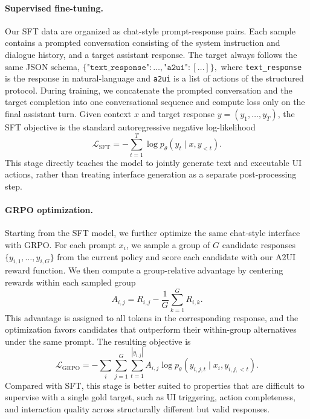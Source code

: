 \documentclass{llmxive}
\begin{document}
\paragraph{Supervised fine-tuning.}
Our SFT data are organized as chat-style prompt-response pairs. Each sample contains a prompted conversation consisting of the system instruction and dialogue history, and a target assistant response. The target always follows the same JSON schema,
\(
\{\texttt{"text\_response"}: \ldots, \texttt{"a2ui"}: [\ldots]\},
\)
where \texttt{text\_response} is the response in natural-language and \texttt{a2ui} is a list of actions of the structured protocol. During training, we concatenate the prompted conversation and the target completion into one conversational sequence and compute loss only on the final assistant turn. Given context $x$ and target response $y=(y_1,\dots,y_T)$, the SFT objective is the standard autoregressive negative log-likelihood
\[
\mathcal{L}_{\mathrm{SFT}}
=
-\sum_{t=1}^{T}\log p_{\theta}(y_t \mid x, y_{<t}).
\]
This stage directly teaches the model to jointly generate text and executable UI actions, rather than treating interface generation as a separate post-processing step.

\paragraph{GRPO optimization.}
Starting from the SFT model, we further optimize the same chat-style interface with GRPO. For each prompt $x_i$, we sample a group of $G$ candidate responses $\{y_{i,1}, \dots, y_{i,G}\}$ from the current policy and score each candidate with our A2UI reward function. We then compute a group-relative advantage by centering rewards within each sampled group
\[
A_{i,j}
=
R_{i,j}
-
\frac{1}{G}\sum_{k=1}^{G} R_{i,k}.
\]
This advantage is assigned to all tokens in the corresponding response, and the optimization favors candidates that outperform their within-group alternatives under the same prompt. The resulting objective is
\[
\mathcal{L}_{\mathrm{GRPO}}
=
-\sum_i \sum_{j=1}^{G}\sum_{t=1}^{|y_{i,j}|}
A_{i,j}
\log p_{\theta}(y_{i,j,t} \mid x_i, y_{i,j,<t}).
\]
Compared with SFT, this stage is better suited to properties that are difficult to supervise with a single gold target, such as UI triggering, action completeness, and interaction quality across structurally different but valid responses.
\end{document}
